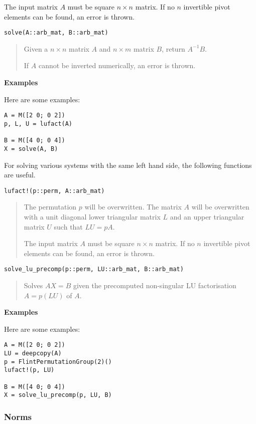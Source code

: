 \documentclass[a4paper,10pt]{article}
\newcommand{\desc}[1]{\vspace{-3mm}\begin{quote}#1\end{quote}}
\begin{document}
{{{The input matrix $A$ must be square $n\times n$ matrix. If no $n$ invertible
pivot elements can be found, an error is thrown.}

\begin{lstlisting}
solve(A::arb_mat, B::arb_mat)
\end{lstlisting}

\desc{Given a $n \times n$ matrix $A$ and $n \times m$ matrix $B$, return $A^{-1}B$.

If $A$ cannot be inverted numerically, an error is thrown.}

\textbf{Examples}

Here are some examples:

\begin{lstlisting}
A = M([2 0; 0 2])
p, L, U = lufact(A)

B = M([4 0; 0 4])
X = solve(A, B)
\end{lstlisting}

For solving various systems with the same left hand side, the following functions
are useful.

\begin{lstlisting}
lufact!(p::perm, A::arb_mat)
\end{lstlisting}

\desc{The permutation $p$ will be overwritten.
The matrix $A$ will be overwritten with a unit diagonal lower triangular matrix $L$
and an upper triangular matrix $U$ such that $LU = pA$.

The input matrix $A$ must be square $n\times n$ matrix. If no $n$ invertible
pivot elements can be found, an error is thrown.}

\begin{lstlisting}
solve_lu_precomp(p::perm, LU::arb_mat, B::arb_mat)
\end{lstlisting}

\desc{Solves $AX = B$ given the precomputed non-singular LU factorisation $A = p(LU)$ of $A$.}

\textbf{Examples}

Here are some examples:

\begin{lstlisting}
A = M([2 0; 0 2])
LU = deepcopy(A)
p = FlintPermutationGroup(2)()
lufact!(p, LU)

B = M([4 0; 0 4])
X = solve_lu_precomp(p, LU, B)
\end{lstlisting}

\subsubsection{Norms}

}}
\end{document}

